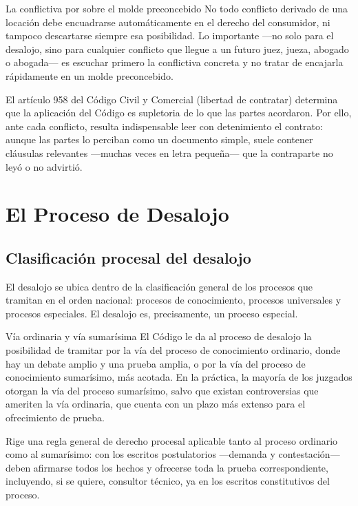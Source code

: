 \documentclass[12pt,oneside]{book}
\begin{document}
\begin{definition}{La conflictiva por sobre el molde preconcebido}
No todo conflicto derivado de una locación debe encuadrarse automáticamente en el derecho del consumidor, ni tampoco descartarse siempre esa posibilidad. Lo importante —no solo para el desalojo, sino para cualquier conflicto que llegue a un futuro juez, jueza, abogado o abogada— es escuchar primero la conflictiva concreta y no tratar de encajarla rápidamente en un molde preconcebido.
\end{definition}

El artículo 958 del Código Civil y Comercial (libertad de contratar) determina que la aplicación del Código es supletoria de lo que las partes acordaron. Por ello, ante cada conflicto, resulta indispensable leer con detenimiento el contrato: aunque las partes lo perciban como un documento simple, suele contener cláusulas relevantes —muchas veces en letra pequeña— que la contraparte no leyó o no advirtió.

\chapter{El Proceso de Desalojo}

\section{Clasificación procesal del desalojo}

El desalojo se ubica dentro de la clasificación general de los procesos que tramitan en el orden nacional: procesos de conocimiento, procesos universales y procesos especiales. El desalojo es, precisamente, un proceso especial.

\begin{definition}{Vía ordinaria y vía sumarísima}
El Código le da al proceso de desalojo la posibilidad de tramitar por la vía del proceso de conocimiento ordinario, donde hay un debate amplio y una prueba amplia, o por la vía del proceso de conocimiento sumarísimo, más acotada. En la práctica, la mayoría de los juzgados otorgan la vía del proceso sumarísimo, salvo que existan controversias que ameriten la vía ordinaria, que cuenta con un plazo más extenso para el ofrecimiento de prueba.
\end{definition}

Rige una regla general de derecho procesal aplicable tanto al proceso ordinario como al sumarísimo: con los escritos postulatorios —demanda y contestación— deben afirmarse todos los hechos y ofrecerse toda la prueba correspondiente, incluyendo, si se quiere, consultor técnico, ya en los escritos constitutivos del proceso.
\end{document}
